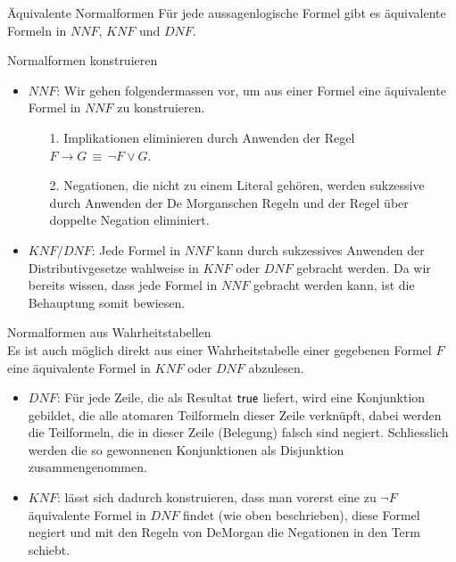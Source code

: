 \begin{lemma}{Äquivalente Normalformen}
Für jede aussagenlogische Formel gibt es äquivalente Formeln in $NNF$, $KNF$ und $DNF$.
\end{lemma}
\begin{howto}{Normalformen konstruieren}
\begin{itemize}
\item $NNF$: Wir gehen folgendermassen vor, um aus einer Formel eine äquivalente Formel in $NNF$ zu konstruieren.
\begin{enumerate}
\item[1.] Implikationen eliminieren durch Anwenden der Regel $F\to G\,\equiv\,\neg F\lor G$.
\item[2.] Negationen, die nicht zu einem Literal gehören, werden sukzessive durch Anwenden der De Morganschen Regeln und der Regel über doppelte Negation eliminiert.
\end{enumerate}
\item $KNF/DNF$: Jede Formel in $NNF$ kann durch sukzessives Anwenden der Distributivgesetze wahlweise in $KNF$ oder $DNF$ gebracht werden. Da wir bereits wissen, dass jede Formel in $NNF$ gebracht werden kann, ist die Behauptung somit bewiesen.  
\end{itemize}
\end{howto}

\begin{howto}{Normalformen aus Wahrheitstabellen}\\
    Es ist auch möglich direkt aus einer Wahrheitstabelle einer gegebenen Formel $F$ eine äquivalente Formel in $KNF$ oder $DNF$ abzulesen. 
    \begin{itemize}
        \item $DNF$:  Für jede Zeile, die als Resultat $\mathsf{true}$ liefert, wird eine Konjunktion gebildet, die alle atomaren Teilformeln dieser Zeile verknüpft, dabei werden die Teilformeln, die in dieser Zeile (Belegung) falsch sind negiert. Schliesslich werden die so gewonnenen Konjunktionen als Disjunktion zusammengenommen.
        \item $KNF$: lässt sich dadurch konstruieren, dass man vorerst eine zu $\neg F$ äquivalente Formel in $DNF$ findet (wie oben beschrieben), diese Formel negiert und mit den Regeln von DeMorgan die Negationen in den Term schiebt.
    \end{itemize}
\end{howto}








